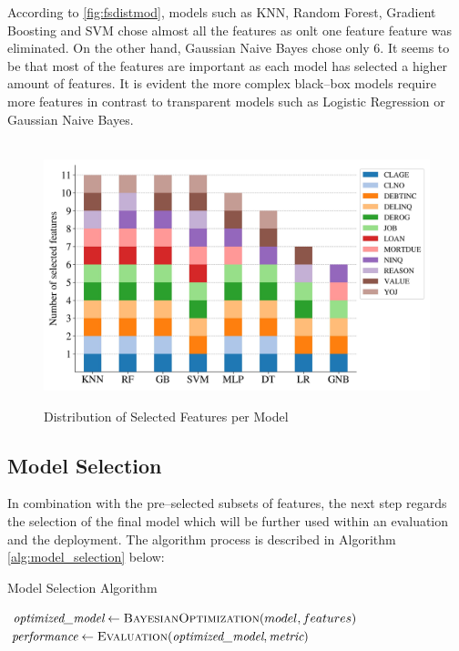 According to \autoref{fig:fsdistmod}, models such as KNN, Random Forest, Gradient Boosting and SVM chose almost all the features as onlt one feature feature was eliminated. On the other hand, Gaussian Naive Bayes chose only 6. It seems to be that most of the features are important as each model has selected a higher amount of features.
It is evident the more complex black--box models require more features in contrast to transparent models such as Logistic Regression or Gaussian Naive Bayes.
\begin{figure}[H]
    \centering
    \caption{Distribution of Selected Features per Model}\vspace{0.5em}
    \label{fig:fsdistmod}\
    \includegraphics[width=120mm]{Figures/Selected_Features_Distribution.jpg}

    \vspace{-1em}
\end{figure}

\newpage
\subsection{Model Selection}
\label{subsec:modelselection}

In combination with the pre--selected subsets of features, the next step regards the selection of the final model which will be further used within an evaluation and the deployment. The algorithm process is described in Algorithm  \autoref{alg:model_selection} below:
\begin{algorithm}[H]
\caption{Model Selection Algorithm}
\label{alg:model_selection}
\begin{algorithmic}[1]
        \State $\textit{optimized\_model} \gets \textsc{BayesianOptimization}(model, features)$
        \For{$\textit{metric} \in \textit{evaluation\_metrics}$}
            \State $\textit{performance} \gets \textsc{Evaluation}(\textit{optimized\_model}, \textit{metric})$
        \EndFor
    \EndFor
\EndFor
\end{algorithmic}
\end{algorithm}


